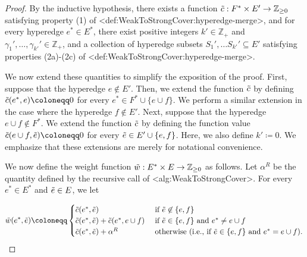 \documentclass{article}
\def\Cref#1{<#1>}%
\providecommand{\Z}{\mathbb{Z}}
\begin{document}
\begin{proof}
    By the inductive hypothesis, there exists a function $\Tilde{c}:F^*\times E' \rightarrow \Z_{\geq 0}$ satisfying property (1) of \Cref{def:WeakToStrongCover:hyperedge-merge}, and for every hyperedge $e^*\in E^*$, there exist positive integers $k' \in \Z_+$ and $\gamma_1', \ldots, \gamma_{k'}' \in \Z_+$, and a collection of hyperedge subsets $S_1', \ldots S_{k'}' \subseteq E'$  satisfying properties (2a)-(2c) of \Cref{def:WeakToStrongCover:hyperedge-merge}.

    We now extend these  quantities to simplify the exposition of the proof. First, suppose that the hyperedge $e \not \in E'$. Then, we extend the function $\Tilde{c}$ by defining $\Tilde{c}(e^*, e) \coloneqq  0$ for every $e^* \in F^* \cup \{e\cup f\}$. We perform a similar extension in the case where the hyperedge $f \not \in E'$. Next, suppose that the hyperedge $e \cup f \not \in F^*$. We extend the function $\Tilde{c}$ by defining the function value $\Tilde{c}(e\cup f, \Tilde{e}) \coloneqq  0$ for every $\Tilde{e} \in E' \cup \{e, f\}$. Here, we also define $k' \coloneqq  0$. We emphasize that these extensions are merely for notational convenience.
   
    We now define the weight function $\Tilde{w}:E^*\times E \rightarrow \Z_{\geq 0}$ as follows. Let $\alpha^R$ be the quantity defined by the recursive call of \Cref{alg:WeakToStrongCover}.
    For every $e^*\in E^*$ and $\Tilde{e} \in E$, we let



$$\Tilde{w}(e^*, \Tilde{e}) \coloneqq  \begin{cases}
        \Tilde{c}(e^*, \Tilde{e})&\text{ if } \Tilde{e} \not\in \{e, f\}\\
        \Tilde{c}(e^*, \Tilde{e}) + \Tilde{c}(e^*, e \cup f)&\text{ if } \Tilde{e} \in \{e, f\} \text{ and } e^* \not = e\cup f\\
        \Tilde{c}(e^*, \Tilde{e}) + \alpha^R& \text{ otherwise (i.e., if $\Tilde{e} \in \{e, f\}$ and $e^* = e \cup f$).}
    \end{cases}$$


\end{proof}
\end{document}
